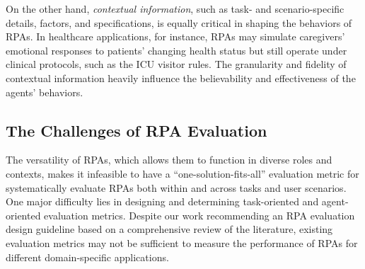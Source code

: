 On the other hand, \textit{contextual information}, such as task- and scenario-specific details, factors, and specifications, is equally critical in shaping the behaviors of RPAs. 
In healthcare applications, for instance, RPAs may simulate caregivers' emotional responses to patients' changing health status but still operate under clinical protocols, such as the ICU visitor rules.
The granularity and fidelity of contextual information heavily influence the believability and effectiveness of the agents' behaviors.






\subsection{The Challenges of RPA Evaluation}


The versatility of RPAs, which allows them to function in diverse roles and contexts, makes it infeasible to have a ``one-solution-fits-all'' evaluation metric for systematically evaluate RPAs both within and across tasks and user scenarios.
One major difficulty lies in designing and determining task-oriented and agent-oriented evaluation metrics. 
Despite our work recommending an RPA evaluation design guideline based on a comprehensive review of the literature, existing evaluation metrics may not be sufficient to measure the performance of RPAs for different domain-specific applications.


